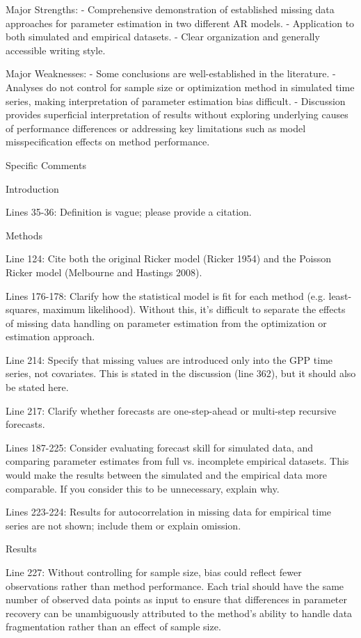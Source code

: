 \documentclass{article}
\begin{document}
Major Strengths:
- Comprehensive demonstration of established missing data approaches for parameter estimation in two different AR models.
- Application to both simulated and empirical datasets.
- Clear organization and generally accessible writing style.

Major Weaknesses:
- Some conclusions are well-established in the literature.
- Analyses do not control for sample size or optimization method in simulated time series, making interpretation of parameter estimation bias difficult.
- Discussion provides superficial interpretation of results without exploring underlying causes of performance differences or addressing key limitations such as model misspecification effects on method performance.

Specific Comments

Introduction

Lines 35-36: Definition is vague; please provide a citation.


Methods

Line 124: Cite both the original Ricker model (Ricker 1954) and the Poisson Ricker model (Melbourne and Hastings 2008).

Lines 176-178: Clarify how the statistical model is fit for each method (e.g. least-squares, maximum likelihood). Without this, it’s difficult to separate the effects of missing data handling on parameter estimation from the optimization or estimation approach.

Line 214: Specify that missing values are introduced only into the GPP time series, not covariates. This is stated in the discussion (line 362), but it should also be stated here.

Line 217: Clarify whether forecasts are one-step-ahead or multi-step recursive forecasts.

Lines 187-225: Consider evaluating forecast skill for simulated data, and comparing parameter estimates from full vs. incomplete empirical datasets. This would make the results between the simulated and the empirical data more comparable. If you consider this to be unnecessary, explain why.

Lines 223-224: Results for autocorrelation in missing data for empirical time series are not shown; include them or explain omission.


Results

Line 227: Without controlling for sample size, bias could reflect fewer observations rather than method performance. Each trial should have the same number of observed data points as input to ensure that differences in parameter recovery can be unambiguously attributed to the method’s ability to handle data fragmentation rather than an effect of sample size.
\end{document}
